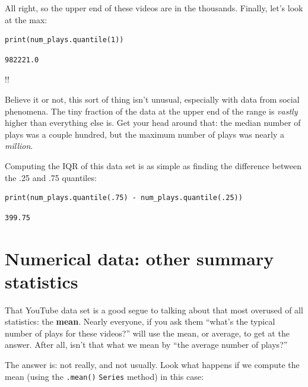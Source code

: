 All right, so the upper end of these videos are in the thousands. Finally,
let's look at the max:

\begin{Verbatim}[fontsize=\small,samepage=true,frame=single,framesep=3mm]
print(num_plays.quantile(1))
\end{Verbatim}
\vspace{-.3in}

\begin{Verbatim}[fontsize=\small,samepage=true,frame=leftline,framesep=5mm,framerule=1mm]
982221.0
\end{Verbatim}

!!

Believe it or not, this sort of thing isn't unusual, especially with data from
social phenomena. The tiny fraction of the data at the upper end of the range
is \textit{vastly} higher than everything else is. Get your head around that:
the median number of plays was a couple hundred, but the maximum number of
plays was nearly a \textit{million}.

\smallskip

Computing the IQR of this data set is as simple as finding the difference
between the .25 and .75 quantiles:

\begin{Verbatim}[fontsize=\small,samepage=true,frame=single,framesep=3mm]
print(num_plays.quantile(.75) - num_plays.quantile(.25))
\end{Verbatim}
\vspace{-.3in}

\begin{Verbatim}[fontsize=\small,samepage=true,frame=leftline,framesep=5mm,framerule=1mm]
399.75
\end{Verbatim}


\section{Numerical data: other summary statistics}


That YouTube data set is a good segue to talking about that most overused of
all statistics: the \textbf{mean}. Nearly everyone, if you ask them ``what's
the typical number of plays for these videos?'' will use the mean, or average,
to get at the answer. After all, isn't that what we mean by ``the average
number of plays?''

The answer is: not really, and not usually. Look what happens if we compute the
mean (using the \texttt{.mean()} \texttt{Series} method) in this case:

